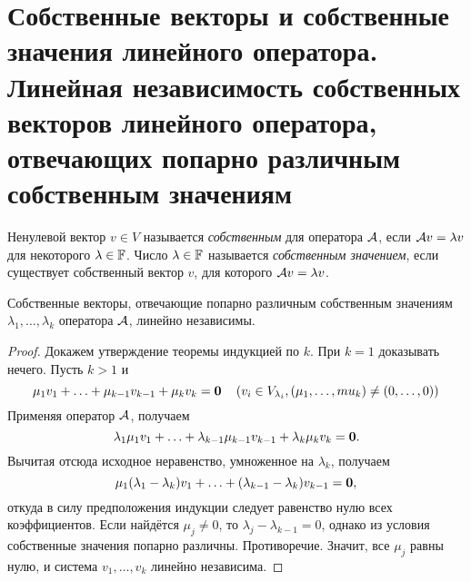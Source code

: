 \section{Собственные векторы и собственные значения линейного оператора. Линейная независимость собственных векторов линейного оператора, отвечающих попарно различным собственным значениям}

\begin{definition}
    Ненулевой вектор $v \in V$ называется \textit{собственным} для оператора $\mathcal{A}$, если $\mathcal{A} v = \lambda v$ для некоторого $\lambda \in \mathbb{F}$. Число $\lambda \in \mathbb{F}$ называется \textit{собственным значением}, если существует собственный вектор $v$, для которого $\mathcal{A} v = \lambda v$.
\end{definition}

\begin{proposal}
    Собственные векторы, отвечающие попарно различным собственным значениям $\lambda_1, \ldots, \lambda_k$ оператора $\mathcal{A}$, линейно независимы.
\end{proposal}

\begin{proof}
    Докажем утверждение теоремы индукцией по $k$. При $k = 1$ доказывать нечего. Пусть $k > 1$ и
    \[
        \mu_1v_1 + \ldots + \mu_{k - 1}v_{k - 1} + \mu_kv_k = \boldsymbol{0}\quad\left(v_i \in V_{\lambda_i}, (\mu_1, \ldots, mu_k) \ne (0, \ldots, 0)\right)
    \]
    Применяя оператор $\mathcal{A}$, получаем
    \[
        \lambda_1\mu_1v_1 + \ldots + \lambda_{k - 1}\mu_{k - 1}v_{k - 1} + \lambda_k\mu_kv_k = \boldsymbol{0}.
    \]
    Вычитая отсюда исходное неравенство, умноженное на $\lambda_k$, получаем
    \[
        \mu_1(\lambda_1 - \lambda_k)v_1 + \ldots + (\lambda_{k - 1} - \lambda_k)v_{k - 1} = \boldsymbol{0},
    \]
    откуда в силу предположения индукции следует равенство нулю всех коэффициентов. Если найдётся $\mu_j \ne 0$, то $\lambda_j - \lambda_{k - 1} = 0$, однако из условия собственные значения попарно различны. Противоречие. Значит, все $\mu_j$ равны нулю, и система $v_1, \ldots, v_k$ линейно независима.
\end{proof}

